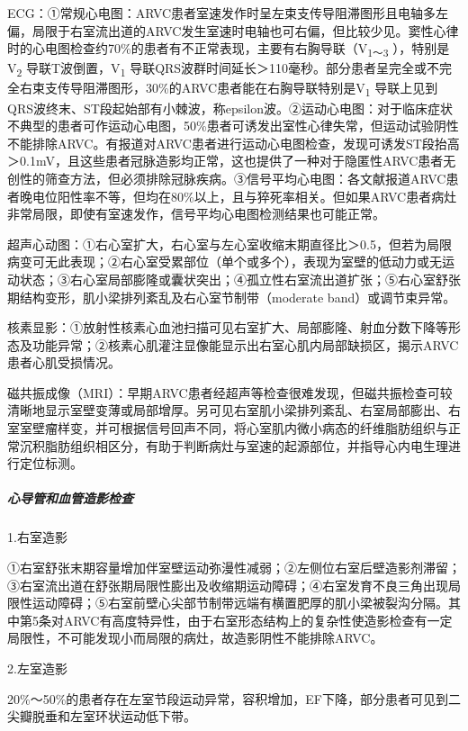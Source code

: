 ECG：①常规心电图：ARVC患者室速发作时呈左束支传导阻滞图形且电轴多左偏，局限于右室流出道的ARVC发生室速时电轴也可右偏，但比较少见。窦性心律时的心电图检查约70\%的患者有不正常表现，主要有右胸导联（V\textsubscript{1～3}
），特别是V\textsubscript{2} 导联T波倒置，V\textsubscript{1}
导联QRS波群时间延长＞110毫秒。部分患者呈完全或不完全右束支传导阻滞图形，30\%的ARVC患者能在右胸导联特别是V\textsubscript{1}
导联上见到QRS波终末、ST段起始部有小棘波，称epsilon波。②运动心电图：对于临床症状不典型的患者可作运动心电图，50\%患者可诱发出室性心律失常，但运动试验阴性不能排除ARVC。有报道对ARVC患者进行运动心电图检查，发现可诱发ST段抬高＞0.1mV，且这些患者冠脉造影均正常，这也提供了一种对于隐匿性ARVC患者无创性的筛查方法，但必须排除冠脉疾病。③信号平均心电图：各文献报道ARVC患者晚电位阳性率不等，但均在80\%以上，且与猝死率相关。但如果ARVC患者病灶非常局限，即使有室速发作，信号平均心电图检测结果也可能正常。

超声心动图：①右心室扩大，右心室与左心室收缩末期直径比＞0.5，但若为局限病变可无此表现；②右心室受累部位（单个或多个），表现为室壁的低动力或无运动状态；③右心室局部膨隆或囊状突出；④孤立性右室流出道扩张；⑤右心室舒张期结构变形，肌小梁排列紊乱及右心室节制带（moderate
band）或调节束异常。

核素显影：①放射性核素心血池扫描可见右室扩大、局部膨隆、射血分数下降等形态及功能异常；②核素心肌灌注显像能显示出右室心肌内局部缺损区，揭示ARVC患者心肌受损情况。

磁共振成像（MRI）：早期ARVC患者经超声等检查很难发现，但磁共振检查可较清晰地显示室壁变薄或局部增厚。另可见右室肌小梁排列紊乱、右室局部膨出、右室室壁瘤样变，并可根据信号回声不同，将心室肌内微小病态的纤维脂肪组织与正常沉积脂肪组织相区分，有助于判断病灶与室速的起源部位，并指导心内电生理进行定位标测。

\subparagraph{心导管和血管造影检查}

\hypertarget{text00139.htmlux5cux23CHP16-3-3-1-4-1-1}{}
1.右室造影

①右室舒张末期容量增加伴室壁运动弥漫性减弱；②左侧位右室后壁造影剂滞留；③右室流出道在舒张期局限性膨出及收缩期运动障碍；④右室发育不良三角出现局限性运动障碍；⑤右室前壁心尖部节制带远端有横置肥厚的肌小梁被裂沟分隔。其中第5条对ARVC有高度特异性，由于右室形态结构上的复杂性使造影检查有一定局限性，不可能发现小而局限的病灶，故造影阴性不能排除ARVC。

\hypertarget{text00139.htmlux5cux23CHP16-3-3-1-4-1-2}{}
2.左室造影

20\%～50\%的患者存在左室节段运动异常，容积增加，EF下降，部分患者可见到二尖瓣脱垂和左室环状运动低下带。

